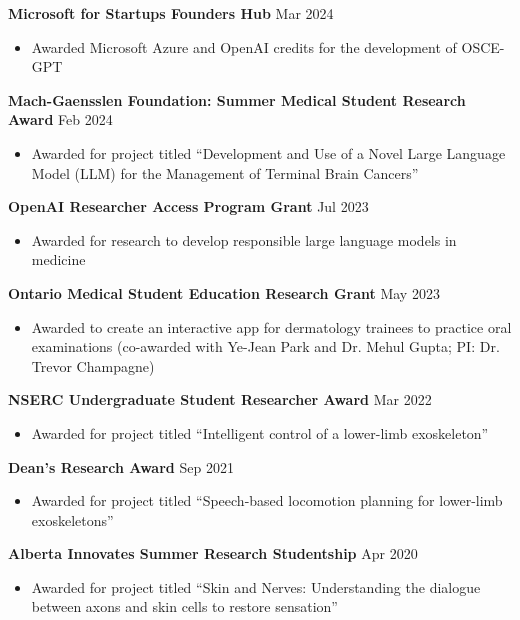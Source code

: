 \documentclass{article}
\begin{document}
\textbf{Microsoft for Startups Founders Hub} \hfill Mar 2024
\begin{itemize}
    \item Awarded Microsoft Azure and OpenAI credits for the development of OSCE-GPT
\end{itemize} \vspace{1em}

\textbf{Mach-Gaensslen Foundation: Summer Medical Student Research Award} \hfill Feb 2024
\begin{itemize}
    \item Awarded for project titled ``Development and Use of a Novel Large Language Model (LLM) for the Management of Terminal Brain Cancers''
\end{itemize} \vspace{1em}

\textbf{OpenAI Researcher Access Program Grant} \hfill Jul 2023
\begin{itemize}
    \item Awarded for research to develop responsible large language models in medicine
\end{itemize} \vspace{1em}

\textbf{Ontario Medical Student Education Research Grant} \hfill May 2023
\begin{itemize}
    \item Awarded to create an interactive app for dermatology trainees to practice oral examinations (co-awarded with Ye-Jean Park and Dr. Mehul Gupta; PI: Dr. Trevor Champagne)
\end{itemize} \vspace{1em}

\textbf{NSERC Undergraduate Student Researcher Award} \hfill Mar 2022
\begin{itemize}
    \item Awarded for project titled ``Intelligent control of a lower-limb exoskeleton''
\end{itemize} \vspace{1em}

\textbf{Dean's Research Award} \hfill Sep 2021
\begin{itemize}
    \item Awarded for project titled ``Speech-based locomotion planning for lower-limb exoskeletons''
\end{itemize} \vspace{1em}

\textbf{Alberta Innovates Summer Research Studentship} \hfill Apr 2020
\begin{itemize}
    \item Awarded for project titled ``Skin and Nerves: Understanding the dialogue between axons and skin cells to restore sensation''
\end{itemize} \vspace{1em}
\end{document}
